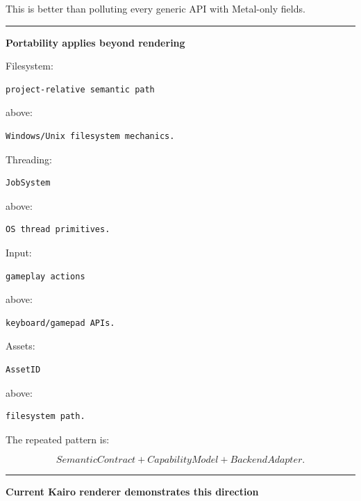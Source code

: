 This is better than polluting every generic API with Metal-only fields.

\begin{center}\rule{0.5\linewidth}{0.5pt}\end{center}

\textbf{Portability applies beyond rendering}

Filesystem:

\begin{verbatim}
project-relative semantic path
\end{verbatim}

above:

\begin{verbatim}
Windows/Unix filesystem mechanics.
\end{verbatim}

Threading:

\begin{verbatim}
JobSystem
\end{verbatim}

above:

\begin{verbatim}
OS thread primitives.
\end{verbatim}

Input:

\begin{verbatim}
gameplay actions
\end{verbatim}

above:

\begin{verbatim}
keyboard/gamepad APIs.
\end{verbatim}

Assets:

\begin{verbatim}
AssetID
\end{verbatim}

above:

\begin{verbatim}
filesystem path.
\end{verbatim}

The repeated pattern is:

\[
\boxed{
SemanticContract
+
CapabilityModel
+
BackendAdapter.
}
\]

\begin{center}\rule{0.5\linewidth}{0.5pt}\end{center}

\textbf{Current Kairo renderer demonstrates this direction}

